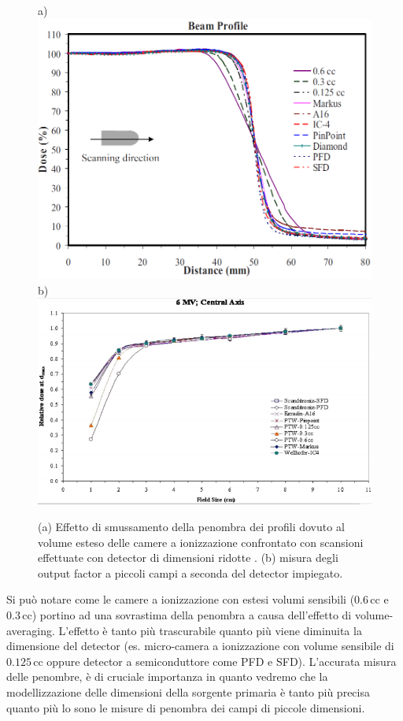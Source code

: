 \begin{figure}[!t]
\centering
a)\includegraphics[width=.75\textwidth]{./cap2/pen_smear.png}\\
b)\includegraphics[width=.75\textwidth]{./cap2/OF_uncert.png}
\caption{(a) Effetto di smussamento della penombra dei profili dovuto al volume esteso delle camere a ionizzazione confrontato con scansioni effettuate con detector di dimensioni ridotte \cite{Das2008a}. (b) misura degli output factor a piccoli campi a seconda del detector impiegato\cite{Das2008}.}
\label{fig:pen_of}
\end{figure}
Si può notare come le camere a ionizzazione con estesi volumi sensibili ($0.6\,$cc e $0.3\,$cc) portino ad una sovrastima della penombra a causa dell'effetto di volume-averaging. L'effetto è tanto più trascurabile quanto più viene diminuita la dimensione del detector (es. micro-camera a ionizzazione con volume sensibile di $0.125\,$cc oppure detector a semiconduttore come PFD e SFD). L'accurata misura delle penombre, è di cruciale importanza in quanto vedremo che la modellizzazione delle dimensioni della sorgente primaria è tanto più precisa quanto più lo sono le misure di penombra dei campi di piccole dimensioni.

